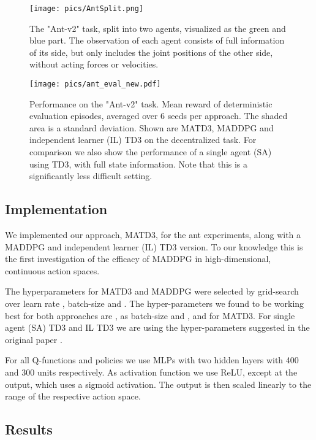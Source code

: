 \documentclass{article}
\begin{document}
\begin{figure}[t]
	\begin{minipage}[t]{0.4\textwidth}
		\centering
\texttt{[image: pics/AntSplit.png]}
		\caption{The "Ant-v2" task, split into two agents, visualized as the green and blue part. The observation of each agent consists of full information of its side, but only includes the joint positions of the other side, without acting forces or velocities.}
		\label{fig:antsplit}
	\end{minipage}
	\hfill
	\begin{minipage}[t]{0.57\textwidth}
		\centering
		\texttt{[image: pics/ant\_eval\_new.pdf]}
		\caption{Performance on the "Ant-v2" task. Mean reward of deterministic evaluation episodes, averaged over 6 seeds per approach. The shaded area is a standard deviation. Shown are \gls*{MATD3}, \gls*{MADDPG} and independent learner (IL) TD3 on the decentralized task. For comparison we also show the performance of a single agent (SA) using \gls*{TD3}, with full state information. Note that this is a significantly less difficult setting.}
		\label{fig:antresults}
	\end{minipage}
\end{figure}
\subsection{Implementation}
We implemented our approach, MATD3, for the ant experiments, along with a MADDPG and independent learner (IL) TD3 version. To our knowledge this is the first investigation of the efficacy of MADDPG in high-dimensional, continuous action spaces.

The hyperparameters for \gls*{MATD3} and \gls*{MADDPG} were selected by grid-search over learn rate , batch-size  and .
The hyper-parameters we found to be working best for both approaches are ,  as batch-size and , and  for \gls*{MATD3}.
For single agent (SA) \gls*{TD3} and IL \gls*{TD3} we are using the hyper-parameters suggested in the original paper \cite{Fujimoto2018}.

For all Q-functions and policies we use \glspl*{MLP} with two hidden layers with 400 and 300 units respectively. 
As activation function we use \gls*{ReLU}, except at the output, which uses a sigmoid activation. 
The output is then scaled linearly to the range of the respective action space.
\vspace{-1mm}
\subsection{Results}
\label{sec:robot-eval}
\end{document}
